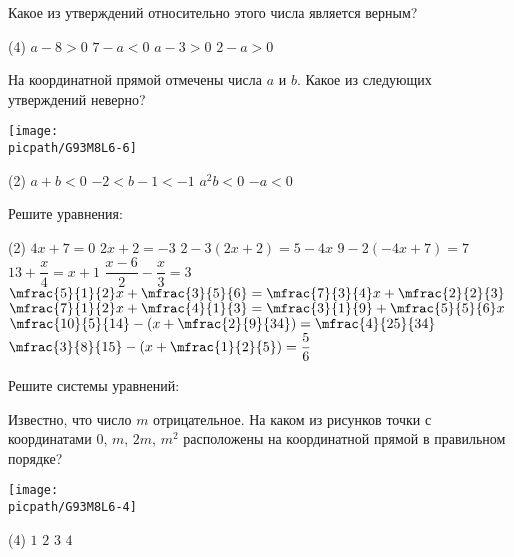 \begin{class}[number=6]
\begin{listofex}
\begin{center}
		\end{center}
		Какое из утверждений относительно этого числа является верным?
		\begin{tasks}(4)
			\task \( a-8>0 \)
			\task \( 7-a<0 \)
			\task \( a-3>0 \)
			\task \( 2-a>0 \)
		\end{tasks}
		\item На координатной прямой отмечены числа \( a \) и \( b \). Какое из следующих утверждений неверно?
		\begin{center}
			\texttt{[image: \\picpath/G93M8L6-6]}
		\end{center}
		\begin{tasks}(2)
			\task \( a+b<0 \)
			\task \( -2<b-1<-1 \)
			\task \( a^2b<0 \)
			\task \( -a<0 \)
		\end{tasks}
		\item Решите уравнения:
		\begin{tasks}(2)
			\task\(4x+7=0\)
			\task \(2x+2=-3\)
			\task \(2-3(2x+2)=5-4x\)
			\task \(9-2(-4x+7)=7\)
			\task \(13+\dfrac{ x }{ 4 }=x+1\)
			\task \(\dfrac{ x-6 }{ 2 }-\dfrac{ x }{ 3 }=3\)
			\task \( \mfrac{5}{1}{2}x+\mfrac{3}{5}{6}=\mfrac{7}{3}{4}x+\mfrac{2}{2}{3} \)
			\task \( \mfrac{7}{1}{2}x+\mfrac{4}{1}{3}=\mfrac{3}{1}{9}+\mfrac{5}{5}{6}x \)
			\task \( \mfrac{10}{5}{14}-\left( x+\mfrac{2}{9}{34} \right)=\mfrac{4}{25}{34}  \)
			\task \( \mfrac{3}{8}{15}-\left( x+\mfrac{1}{2}{5} \right)=\dfrac{ 5 }{ 6 }  \)
		\end{tasks}
		\item Решите системы уравнений:
		\begin{itasks}[2]
			\task \exercise{191}
			\task \exercise{190}
			\task \exercise{206}
			\task \exercise{207}
		\end{itasks}
	\end{listofex}
\end{class}

\begin{homework}[number=3]
	\begin{listofex}
		\item Известно, что число \( m \) отрицательное. На каком из рисунков точки с координатами \( 0 \), \( m \), \( 2m \), \( m^2 \) расположены на координатной прямой в правильном порядке?
		\begin{center}
			\texttt{[image: \\picpath/G93M8L6-4]}
		\end{center}
		\begin{tasks}(4)
			\task \( 1 \)
			\task \( 2 \)
			\task \( 3 \)
			\task \( 4 \)
		\end{tasks}
	\end{listofex}
\end{homework}

